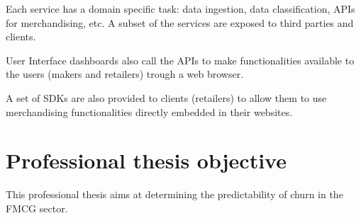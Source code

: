 Each service has a domain specific task: data ingestion, data classification, APIs for merchandising, etc. A subset of the services  are exposed to third parties and clients.

User Interface dashboards also call the APIs to make functionalities available to the users (makers and retailers) trough a web browser.

A set of SDKs are also provided to clients (retailers) to allow them to use merchandising functionalities directly embedded in their websites.

\section{Professional thesis objective}

This professional thesis aims at determining the predictability of churn in the FMCG sector.

